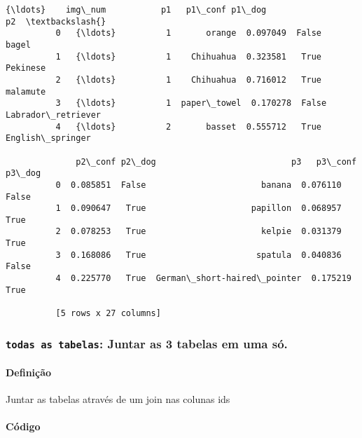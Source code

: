 \documentclass[11pt]{article}
\begin{document}
\begin{Verbatim}[commandchars=\\\{\}]
              {\ldots}    img\_num           p1   p1\_conf p1\_dog                  p2  \textbackslash{}
          0   {\ldots}          1       orange  0.097049  False               bagel   
          1   {\ldots}          1    Chihuahua  0.323581   True            Pekinese   
          2   {\ldots}          1    Chihuahua  0.716012   True            malamute   
          3   {\ldots}          1  paper\_towel  0.170278  False  Labrador\_retriever   
          4   {\ldots}          2       basset  0.555712   True    English\_springer   
          
              p2\_conf p2\_dog                           p3   p3\_conf  p3\_dog  
          0  0.085851  False                       banana  0.076110   False  
          1  0.090647   True                     papillon  0.068957    True  
          2  0.078253   True                       kelpie  0.031379    True  
          3  0.168086   True                      spatula  0.040836   False  
          4  0.225770   True  German\_short-haired\_pointer  0.175219    True  
          
          [5 rows x 27 columns]
\end{Verbatim}
            
    \hypertarget{todas-as-tabelas-juntar-as-3-tabelas-em-uma-suxf3.}{%
\subsubsection{\texorpdfstring{\texttt{todas\ as\ tabelas}: Juntar as 3
tabelas em uma
só.}{todas as tabelas: Juntar as 3 tabelas em uma só.}}\label{todas-as-tabelas-juntar-as-3-tabelas-em-uma-suxf3.}}

    \hypertarget{definiuxe7uxe3o}{%
\paragraph{Definição}\label{definiuxe7uxe3o}}

    Juntar as tabelas através de um join nas colunas ids

    \hypertarget{cuxf3digo}{%
\paragraph{Código}\label{cuxf3digo}}
\end{document}
